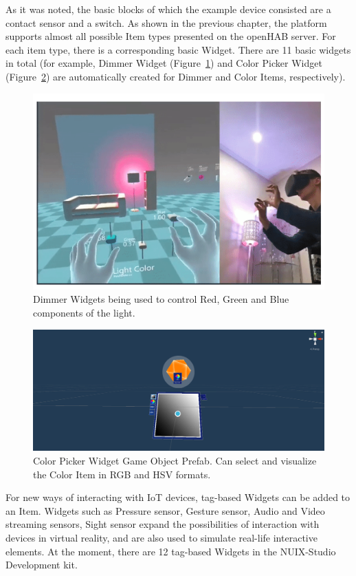As it was noted, the basic blocks of which the example device consisted are a contact sensor and a switch. As shown in the previous chapter, the platform supports almost all possible Item types presented on the openHAB server. For each item type, there is a corresponding basic Widget. There are 11 basic widgets in total (for example, Dimmer Widget (Figure~\ref{fig:DimmerWidgets-figure}) and Color Picker Widget (Figure~\ref{fig:ColorPickerWidget-figure}) are automatically created for Dimmer and Color Items, respectively). 

\begin{figure}
  \centering
  \includegraphics[width=0.9\linewidth]{figures/DimmerWidgets.png}
  \caption{Dimmer Widgets being used to control Red, Green and Blue components of the light.}
  \label{fig:DimmerWidgets-figure}
\end{figure}

\begin{figure}
  \centering
  \includegraphics[width=0.9\linewidth]{figures/ColorPickerWidget.png}
  \caption{Color Picker Widget Game Object Prefab. Can select and visualize the Color Item in RGB and HSV formats.}
  \label{fig:ColorPickerWidget-figure}
\end{figure}

For new ways of interacting with IoT devices, tag-based Widgets can be added to an Item. Widgets such as Pressure sensor, Gesture sensor, Audio and Video streaming sensors, Sight sensor expand the possibilities of interaction with devices in virtual reality, and are also used to simulate real-life interactive elements. At the moment, there are 12 tag-based Widgets in the NUIX-Studio Development kit. 

